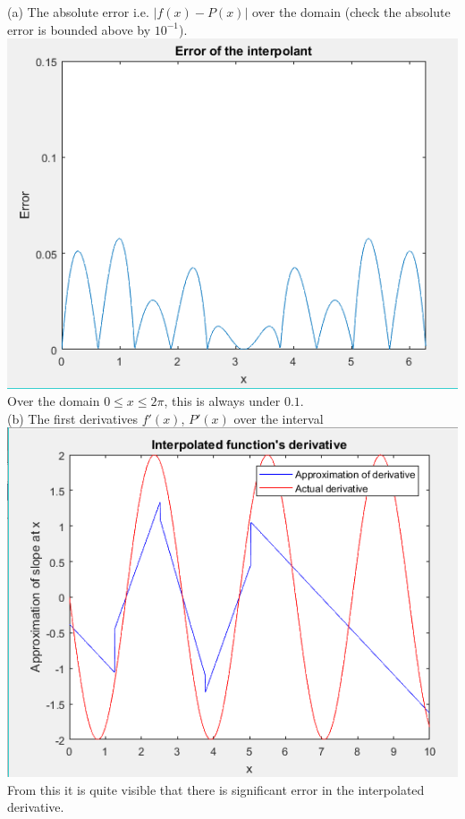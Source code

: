 \documentclass[a4paper]{article}
\begin{document}
	(a) The absolute error i.e. $|f(x)-P(x)|$ over the domain (check the absolute error is bounded above by $10^{-1}$).\\
	\includegraphics{errorgraph.PNG}\\
	Over the domain $0\leq x \leq 2\pi$, this is always under $0.1$.\\
	\newpage
	(b) The first derivatives $f'(x)$, $P'(x)$ over the interval\\
	
	\includegraphics{plotderivatives.PNG}\\
	From this it is quite visible that there is significant error in the interpolated derivative.
	
\end{document}
